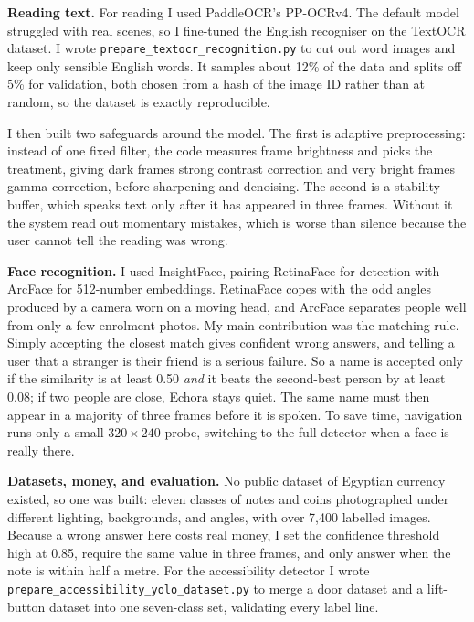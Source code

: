 \documentclass[12pt,a4paper]{report}
\begin{document}
\noindent\textbf{Reading text.} For reading I used PaddleOCR's PP-OCRv4. The
default model struggled with real scenes, so I fine-tuned the English recogniser
on the TextOCR dataset. I wrote \texttt{prepare\_textocr\_recognition.py} to cut
out word images and keep only sensible English words. It samples about 12\% of
the data and splits off 5\% for validation, both chosen from a hash of the image
ID rather than at random, so the dataset is exactly reproducible.

I then built two safeguards around the model. The first is adaptive
preprocessing: instead of one fixed filter, the code measures frame brightness
and picks the treatment, giving dark frames strong contrast correction and very
bright frames gamma correction, before sharpening and denoising. The second is a
stability buffer, which speaks text only after it has appeared in three frames.
Without it the system read out momentary mistakes, which is worse than silence
because the user cannot tell the reading was wrong.

\noindent\textbf{Face recognition.} I used InsightFace, pairing RetinaFace for
detection with ArcFace for 512-number embeddings. RetinaFace copes with the odd
angles produced by a camera worn on a moving head, and ArcFace separates people
well from only a few enrolment photos. My main contribution was the matching
rule. Simply accepting the closest match gives confident wrong answers, and
telling a user that a stranger is their friend is a serious failure. So a name
is accepted only if the similarity is at least 0.50 \emph{and} it beats the
second-best person by at least 0.08; if two people are close, Echora stays quiet.
The same name must then appear in a majority of three frames before it is spoken.
To save time, navigation runs only a small $320\times240$ probe, switching to the
full detector when a face is really there.

\noindent\textbf{Datasets, money, and evaluation.} No public dataset of Egyptian
currency existed, so one was built: eleven classes of notes and coins
photographed under different lighting, backgrounds, and angles, with over 7,400
labelled images. Because a wrong answer here costs real money, I set the
confidence threshold high at 0.85, require the same value in three frames, and
only answer when the note is within half a metre. For the accessibility detector
I wrote \texttt{prepare\_accessibility\_yolo\_dataset.py} to merge a door dataset
and a lift-button dataset into one seven-class set, validating every label line.
\end{document}
